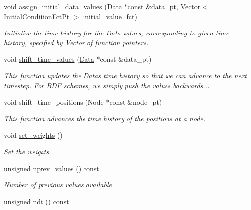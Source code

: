 \begin{DoxyCompactItemize}
void \hyperlink{classoomph_1_1BDF_ae40c166092d039798704a8969c0acc0e}{assign\+\_\+initial\+\_\+data\+\_\+values} (\hyperlink{classoomph_1_1Data}{Data} $\ast$const \&data\+\_\+pt, \hyperlink{classoomph_1_1Vector}{Vector}$<$ \hyperlink{classoomph_1_1BDF_a7b4271c53928ee107dc9b5ab218bfe74}{Initial\+Condition\+Fct\+Pt} $>$ initial\+\_\+value\+\_\+fct)
\begin{DoxyCompactList}\small\item\em Initialise the time-\/history for the \hyperlink{classoomph_1_1Data}{Data} values, corresponding to given time history, specified by \hyperlink{classoomph_1_1Vector}{Vector} of function pointers. \end{DoxyCompactList}\item 
void \hyperlink{classoomph_1_1BDF_a037ce83f202e4ba2e61666bfdb1ce4b9}{shift\+\_\+time\+\_\+values} (\hyperlink{classoomph_1_1Data}{Data} $\ast$const \&data\+\_\+pt)
\begin{DoxyCompactList}\small\item\em This function updates the \hyperlink{classoomph_1_1Data}{Data}\textquotesingle{}s time history so that we can advance to the next timestep. For \hyperlink{classoomph_1_1BDF}{B\+DF} schemes, we simply push the values backwards... \end{DoxyCompactList}\item 
void \hyperlink{classoomph_1_1BDF_aad5191a5605337d43458d42f67460dbd}{shift\+\_\+time\+\_\+positions} (\hyperlink{classoomph_1_1Node}{Node} $\ast$const \&node\+\_\+pt)
\begin{DoxyCompactList}\small\item\em This function advances the time history of the positions at a node. \end{DoxyCompactList}\item 
void \hyperlink{classoomph_1_1BDF_a59cfd069cfa09e8b342cbf2d5234c7ce}{set\+\_\+weights} ()
\begin{DoxyCompactList}\small\item\em Set the weights. \end{DoxyCompactList}\item 
unsigned \hyperlink{classoomph_1_1BDF_ae6fac2faf065b8abf2afff64b63874f6}{nprev\+\_\+values} () const
\begin{DoxyCompactList}\small\item\em Number of previous values available. \end{DoxyCompactList}\item 
unsigned \hyperlink{classoomph_1_1BDF_a6bfaedcd81cad549615bd21ce4336421}{ndt} () const

\end{DoxyCompactItemize}
